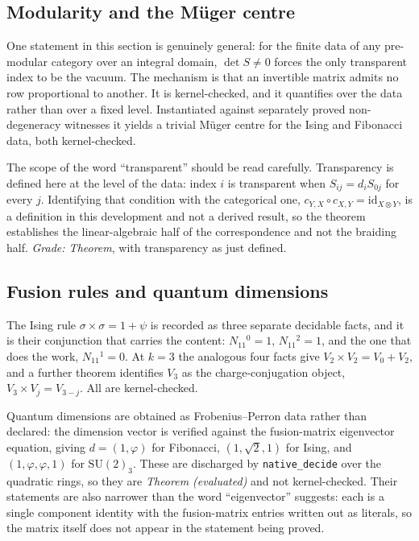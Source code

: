 \documentclass[aps,prx,nofootinbib,superscriptaddress,12pt]{revtex4-2}
\begin{document}
\subsection{Modularity and the M\"uger centre}

One statement in this section is genuinely general: for the finite data
of any pre-modular category over an integral domain, $\det S \neq 0$
forces the only transparent index to be the vacuum. The mechanism is
that an invertible matrix admits no row proportional to another. It is
kernel-checked, and it quantifies over the data rather than over a fixed
level. Instantiated against separately proved non-degeneracy witnesses
it yields a trivial M\"uger centre for the Ising and Fibonacci data,
both kernel-checked.

The scope of the word ``transparent'' should be read carefully.
Transparency is defined here at the level of the data: index $i$ is
transparent when $S_{ij} = d_i S_{0j}$ for every $j$. Identifying that
condition with the categorical one,
$c_{Y,X}\circ c_{X,Y} = \mathrm{id}_{X\otimes Y}$, is a definition in
this development and not a derived result, so the theorem establishes
the linear-algebraic half of the correspondence and not the braiding
half. \emph{Grade: Theorem}, with transparency as just defined.

\subsection{Fusion rules and quantum dimensions}

The Ising rule $\sigma\times\sigma = 1 + \psi$ is recorded as three
separate decidable facts, and it is their conjunction that carries the
content: $N_{11}{}^{0} = 1$, $N_{11}{}^{2} = 1$, and the one that does
the work, $N_{11}{}^{1} = 0$. At $k = 3$ the analogous four facts give
$V_2 \times V_2 = V_0 + V_2$, and a further theorem identifies $V_3$ as
the charge-conjugation object, $V_3 \times V_j = V_{3-j}$. All are
kernel-checked.

Quantum dimensions are obtained as Frobenius--Perron data rather than
declared: the dimension vector is verified against the fusion-matrix
eigenvector equation, giving $d = (1,\varphi)$ for Fibonacci,
$(1,\sqrt2,1)$ for Ising, and $(1,\varphi,\varphi,1)$ for
$\mathrm{SU}(2)_3$. These are discharged by \texttt{native\_decide} over
the quadratic rings, so they are \emph{Theorem (evaluated)} and not
kernel-checked. Their statements are also narrower than the word
``eigenvector'' suggests: each is a single component identity with the
fusion-matrix entries written out as literals, so the matrix itself does
not appear in the statement being proved.
\end{document}
